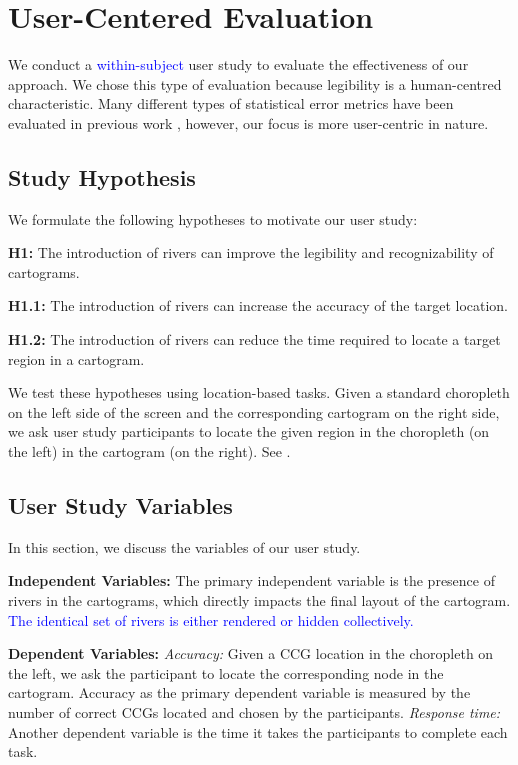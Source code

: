 \documentclass[Afour,sagev,times]{sagej}
\newcommand{\new}[1]{\textcolor{blue}{#1}}
\newcommand{\bobgraph}[1]{\noindent\textbf{#1}}
\begin{document}
\newcommand{\pCount}{24 }
\section{User-Centered Evaluation}\label{sec:{User-Centered Evaluation}}

We conduct a \new{within-subject} user study to evaluate the effectiveness of our approach.
We chose this type of evaluation because legibility is a human-centred characteristic.
Many different types of statistical error metrics have been evaluated in previous work \cite{nusrat2016State}, however, our focus is more user-centric in nature.

\subsection{Study Hypothesis}\label{subsec:{Study Hypothesis}}

We formulate the following hypotheses to motivate our user study:

\textbf{H1:} The introduction of rivers can improve the legibility and recognizability of cartograms.

\textbf{H1.1:} The introduction of rivers can increase the accuracy of the target location.

\textbf{H1.2:} The introduction of rivers can reduce the time required to locate a target region in a cartogram.

We test these hypotheses using location-based tasks.
Given a standard choropleth on the left side of the screen and the corresponding cartogram on the right side, we ask user study participants to locate the given region in the choropleth (on the left) in the cartogram (on the right).
See .

\subsection{User Study Variables}\label{subsec:{User Study Variables}}

In this section, we discuss the variables of our user study.

\bobgraph{Independent Variables: }The primary independent variable is the presence of rivers in the cartograms, which directly impacts the final layout of the cartogram. 
\new{The identical set of rivers is either rendered or hidden collectively.}

\bobgraph{Dependent Variables: }\textit{Accuracy:} Given a CCG location in the choropleth on the left, we ask the participant to locate the corresponding node in the cartogram.
Accuracy as the primary dependent variable is measured by the number of correct CCGs located and chosen by the participants.
\textit{Response time:} Another dependent variable is the time it takes the participants to complete each task.
\end{document}
